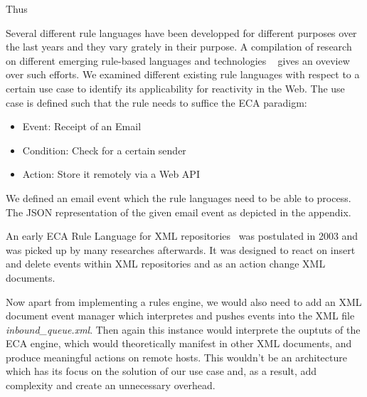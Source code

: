 Thus 





Several different rule languages have been developped for different purposes over the last years and they vary grately in their purpose.
A compilation of research on different emerging rule-based languages and technologies ~\cite{2009-Paschke_Boley-RCER.pdf} gives an oveview over such efforts.
We examined different existing rule languages with respect to a certain use case to identify its applicability for reactivity in the Web. %
The use case is defined such that the rule needs to suffice the ECA paradigm:

\begin{itemize}
  \item Event: Receipt of an Email
  \item Condition: Check for a certain sender
  \item Action: Store it remotely via a Web API
\end{itemize}

We defined an email event which the rule languages need to be able to process.
The JSON representation of the given email event as depicted in the appendix. %


An early ECA Rule Language for XML repositories~\cite{Papamarkos03event-condition-actionrule} was postulated in 2003 and was picked up by many researches afterwards. It was designed to react on insert and delete events within XML repositories and as an action change XML documents.


Now apart from implementing a rules engine, we would also need to add an XML document event manager which interpretes and pushes events into the XML file \emph{inbound\_queue.xml}. Then again this instance would interprete the ouptuts of the ECA engine, which would theoretically manifest in other XML documents, and produce meaningful actions on remote hosts. This wouldn't be an architecture which has its focus on the solution of our use case and, as a result, add complexity and create an unnecessary overhead.


